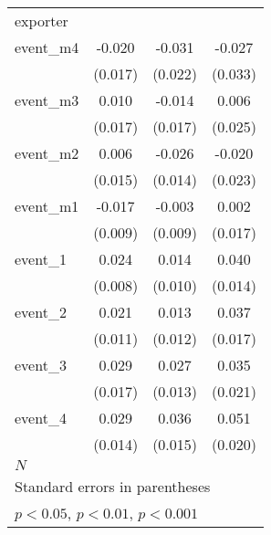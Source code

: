 {\begin{tabular}{l*{3}{c}}
\hline
exporter    &                     &                     &                     \\
event\_m4    &      -0.020         &      -0.031         &      -0.027         \\
            &     (0.017)         &     (0.022)         &     (0.033)         \\
[1em]
event\_m3    &       0.010         &      -0.014         &       0.006         \\
            &     (0.017)         &     (0.017)         &     (0.025)         \\
[1em]
event\_m2    &       0.006         &      -0.026         &      -0.020         \\
            &     (0.015)         &     (0.014)         &     (0.023)         \\
[1em]
event\_m1    &      -0.017         &      -0.003         &       0.002         \\
            &     (0.009)         &     (0.009)         &     (0.017)         \\
[1em]
event\_1     &       0.024\sym{**} &       0.014         &       0.040\sym{**} \\
            &     (0.008)         &     (0.010)         &     (0.014)         \\
[1em]
event\_2     &       0.021         &       0.013         &       0.037\sym{*}  \\
            &     (0.011)         &     (0.012)         &     (0.017)         \\
[1em]
event\_3     &       0.029         &       0.027\sym{*}  &       0.035         \\
            &     (0.017)         &     (0.013)         &     (0.021)         \\
[1em]
event\_4     &       0.029\sym{*}  &       0.036\sym{*}  &       0.051\sym{*}  \\
            &     (0.014)         &     (0.015)         &     (0.020)         \\
\hline
\(N\)       &                     &                     &                     \\
\hline\hline
\multicolumn{4}{l}{\footnotesize Standard errors in parentheses}\\
\multicolumn{4}{l}{\footnotesize \sym{*} \(p<0.05\), \sym{**} \(p<0.01\), \sym{***} \(p<0.001\)}\\
\end{tabular}
}
